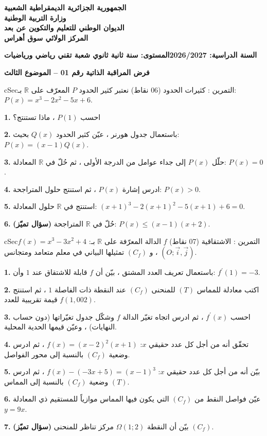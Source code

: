 \documentclass[12pt,a4paper]{article}
\newenvironment{BOX}[2]{\begin{otherlanguage}{english}\begin{arbox}{#1}{#2}}{\end{arbox}\end{otherlanguage}}
\newcounter{exo}
\newenvironment{tamrin}[1]{\stepcounter{exo}\begin{BOX}{cSec}{التمرين \theexo: #1}}{\end{BOX}}
\newenvironment{LTR}{\begin{otherlanguage}{english}}{\end{otherlanguage}}
\newcommand{\R}{\mathbb{R}}
\newcommand{\QQ}[1]{\par\smallskip\textbf{#1.} }
\begin{document}
\begin{center}
{\large\bfseries الجمهورية الجزائرية الديمقراطية الشعبية}\\[2pt]
{\bfseries وزارة التربية الوطنية}\\[2pt]
{\bfseries الديوان الوطني للتعليم والتكوين عن بعد}\\[2pt]
{\bfseries المركز الولائي سوق أهراس}
\end{center}
\noindent\textbf{السنة الدراسية: 2026/2027}\hfill\textbf{المستوى: سنة ثانية ثانوي شعبة تقني رياضي ورياضيات}
\par\smallskip
\begin{LTR}
\begin{tcolorbox}[enhanced,colback=cSec,colframe=cSec,arc=2mm,halign=center,boxrule=0pt,top=6pt,bottom=6pt,before upper={\selectlanguage{arabic}}]
{\color{white}\Large\bfseries فرض المراقبة الذاتية رقم 01 -- الموضوع الثالث}
\end{tcolorbox}
\end{LTR}

\begin{tamrin}{كثيرات الحدود (06 نقاط)}
نعتبر كثير الحدود $P$ المعرّف على $\R$ بـ: $P(x)=x^3-2x^2-5x+6$.
\QQ{1} احسب $P(1)$ ، ماذا تستنتج؟
\QQ{2} باستعمال جدول هورنر ، عيّن كثير الحدود $Q(x)$ بحيث: $P(x)=(x-1)Q(x)$.
\QQ{3} حلّل $P(x)$ إلى جداء عوامل من الدرجة الأولى ، ثم حُلّ في $\R$ المعادلة: $P(x)=0$.
\QQ{4} ادرس إشارة $P(x)$ ، ثم استنتج حلول المتراجحة: $P(x)>0$.
\QQ{5} استنتج في $\R$ حلول المعادلة: $(x+1)^3-2(x+1)^2-5(x+1)+6=0$.
\QQ{6} \textbf{(سؤال تميّز)} حُلّ في $\R$ المتراجحة: $P(x)\leqslant(x-1)(x+2)$.
\end{tamrin}

\begin{tamrin}{الاشتقاقية (07 نقاط)}
$f$ الدالة المعرّفة على $\R$ بـ: $f(x)=x^3-3x^2+4$ ، و $(C_f)$ تمثيلها البياني في معلم متعامد ومتجانس $\left(O;\vec i,\vec j\right)$.
\QQ{1} باستعمال تعريف العدد المشتق ، بيّن أن $f$ قابلة للاشتقاق عند $1$ وأن: $f^{\prime}(1)=-3$.
\QQ{2} اكتب معادلة للمماس $(T)$ للمنحنى $(C_f)$ عند النقطة ذات الفاصلة $1$ ، ثم استنتج قيمة تقريبية للعدد $f(1{,}002)$.
\QQ{3} احسب $f^{\prime}(x)$ ، ثم ادرس اتجاه تغيّر الدالة $f$ وشكّل جدول تغيّراتها (دون حساب النهايات) ، وعيّن قيمها الحدية المحلية.
\QQ{4} تحقّق أنه من أجل كل عدد حقيقي $x$: $f(x)=(x-2)^2(x+1)$ ، ثم ادرس وضعية $(C_f)$ بالنسبة إلى محور الفواصل.
\QQ{5} بيّن أنه من أجل كل عدد حقيقي $x$: $f(x)-(-3x+5)=(x-1)^3$ ، ثم ادرس وضعية $(C_f)$ بالنسبة إلى المماس $(T)$.
\QQ{6} عيّن فواصل النقط من $(C_f)$ التي يكون فيها المماس موازياً للمستقيم ذي المعادلة $y=9x$.
\QQ{7} \textbf{(سؤال تميّز)} بيّن أن النقطة $\Omega(1;2)$ مركز تناظر للمنحنى $(C_f)$.
\end{tamrin}
\end{document}
